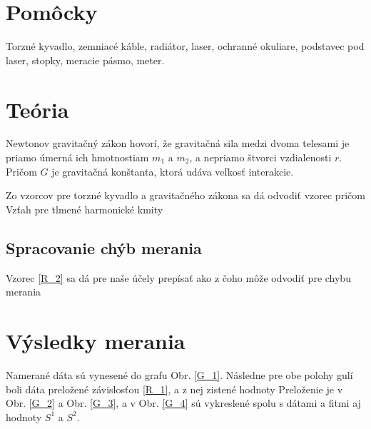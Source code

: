 \documentclass[a4paper,10pt]{article}
\begin{document}
\section{Pomôcky}
Torzné kyvadlo, zemniacé káble, radiátor, laser, ochranné okuliare, podstavec pod laser,
stopky, meracie pásmo, meter.

\section{Teória}
Newtonov gravitačný zákon 
hovorí, že gravitačná sila medzi dvoma telesami je priamo úmerná ich hmotnostiam $m_1$ a $m_2$, a nepriamo štvorci vzdialenosti $r$.
Pričom $G$ je gravitačná konštanta, ktorá udáva veľkosť interakcie.

Zo vzorcov pre torzné kyvadlo a gravitačného zákona sa dá odvodiť vzorec pričom 
Vzťah pre tlmené harmonické kmity
\subsection{Spracovanie chýb merania}

Vzorec \ref{R_2} sa dá pre naše účely prepísať ako  z čoho môže odvodiť pre chybu merania



\section{Výsledky merania}

Namerané dáta sú vynesené do grafu Obr. \ref{G_1}. 
Následne pre obe polohy gulí boli dáta preložené závislosťou \eqref{R_1}, a z nej zistené hodnoty 
Preloženie je v Obr. \ref{G_2} a Obr. \ref{G_3}, a v Obr. \ref{G_4} sú vykreslené spolu s dátami a fitmi aj hodnoty $S^1$ a $S^2$.
\end{document}
